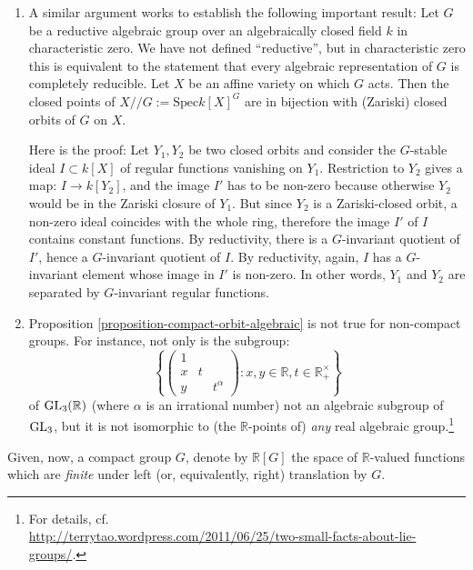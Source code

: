 \begin{remarks}
\label{remarks-compact-orbit-algebraic}
\begin{enumerate}
 \item A similar argument works to establish the following important result: Let $G$ be a reductive algebraic group over an algebraically closed field $k$ in characteristic zero. We have not defined ``reductive'', but in characteristic zero this is equivalent to the statement that every algebraic representation of $G$ is completely reducible. Let $X$ be an affine variety on which $G$ acts. Then the closed points of $X// G:=\text{Spec} k[X]^G$ are in bijection with (Zariski) closed orbits of $G$ on $X$.

Here is the proof: Let $Y_1, Y_2$ be two closed orbits and consider the $G$-stable ideal $I\subset k[X]$ of regular functions vanishing on $Y_1$. Restriction to $Y_2$ gives a map: $I\to k[Y_2]$, and the image $I'$ has to be non-zero because otherwise $Y_2$ would be in the Zariski closure of $Y_1$. But since $Y_2$ is a Zariski-closed orbit, a non-zero ideal coincides with the whole ring, therefore the image $I'$ of $I$ contains constant functions. By reductivity, there is a $G$-invariant quotient of $I'$, hence a $G$-invariant quotient of $I$. By reductivity, again, $I$ has a $G$-invariant element whose image in $I'$ is non-zero. In other words, $Y_1$ and $Y_2$ are separated by $G$-invariant regular functions.


\item Proposition \ref{proposition-compact-orbit-algebraic} is not true for non-compact groups. For instance, not only is the subgroup:
$$\left\{\left(\begin{array}{ccc} 1 \\ x & t \\ y && t^\alpha \end{array}\right): x,y\in \mathbb R, t\in \mathbb R_+^\times \right\}$$
of ${\rm GL}_3(\mathbb R)$ (where $\alpha$ is an irrational number) not an algebraic subgroup of ${\rm GL}_3$, but it is not isomorphic to (the $\mathbb R$-points of) \emph{any} real algebraic group.\footnote{For details, cf.\ \\ \url{http://terrytao.wordpress.com/2011/06/25/two-small-facts-about-lie-groups/}.}

\end{enumerate}

\end{remarks}

Given, now, a compact group $G$, denote by $\mathbb R[G]$ the space of $\mathbb R$-valued functions which are \emph{finite} under left (or, equivalently, right) translation by $G$. 

